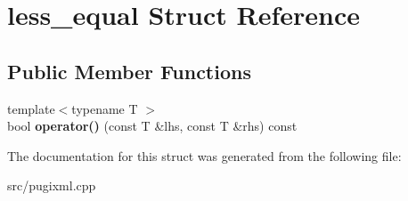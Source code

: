 \hypertarget{structless__equal}{}\section{less\+\_\+equal Struct Reference}
\label{structless__equal}
\subsection*{Public Member Functions}
\begin{DoxyCompactItemize}
\item 
\mbox{\label{structless__equal_ad2b3a8483fdbe64d26a15df8a1e7cc9a}} 
{\footnotesize template$<$typename T $>$ }\\bool {\bfseries operator()} (const T \&lhs, const T \&rhs) const
\end{DoxyCompactItemize}


The documentation for this struct was generated from the following file\+:\begin{DoxyCompactItemize}
\item 
src/pugixml.\+cpp\end{DoxyCompactItemize}
